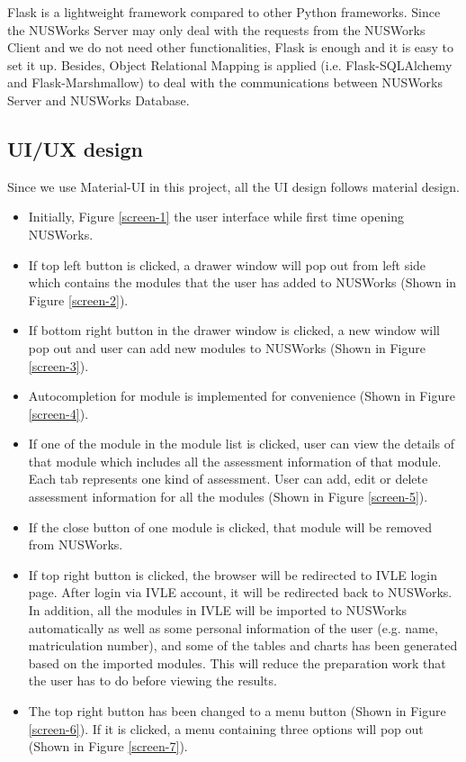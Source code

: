 \documentclass[fyp]{socreport}
\begin{document}
Flask is a lightweight framework compared to other Python frameworks. Since the NUSWorks Server may only deal with the requests from the NUSWorks Client and we do not need other functionalities, Flask is enough and it is easy to set it up. Besides, Object Relational Mapping is applied (i.e. Flask-SQLAlchemy and Flask-Marshmallow) to deal with the communications between NUSWorks Server and NUSWorks Database.

\subsection{UI/UX design}
Since we use Material-UI in this project, all the UI design follows material design.
\begin{itemize}
	\item Initially, Figure {\ref{screen-1}} the user interface while first time opening NUSWorks.
	\item If top left button is clicked, a drawer window will pop out from left side which contains the modules that the user has added to NUSWorks (Shown in Figure {\ref{screen-2}}).
	\item If bottom right button in the drawer window is clicked, a new window will pop out and user can add new modules to NUSWorks (Shown in Figure {\ref{screen-3}}).
	\item Autocompletion for module is implemented for convenience (Shown in Figure {\ref{screen-4}}).
	\item If one of the module in the module list is clicked, user can view the details of that module which includes all the assessment information of that module. Each tab represents one kind of assessment. User can add, edit or delete assessment information for all the modules (Shown in Figure {\ref{screen-5}}).
	\item If the close button of one module is clicked, that module will be removed from NUSWorks.
	\item If top right button is clicked, the browser will be redirected to IVLE login page. After login via IVLE account, it will be redirected back to NUSWorks. In addition, all the modules in IVLE will be imported to NUSWorks automatically as well as some personal information of the user (e.g. name, matriculation number), and some of the tables and charts has been generated based on the imported modules. This will reduce the preparation work that the user has to do before viewing the results.
	\item The top right button has been changed to a menu button (Shown in Figure {\ref{screen-6}}). If it is clicked, a menu containing three options will pop out (Shown in Figure {\ref{screen-7}}).

\end{itemize}
\end{document}
